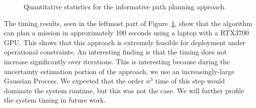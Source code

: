 \begin{figure}[H]
    \hfill
    \hfill
    \centering
    \caption{Quantitative statistics for the informative path planning approach.}
    \label{fig:results:ipp_quant}
\end{figure}

The timing results, seen in the leftmost part of Figure~\ref{fig:results:ipp_quant}, show that the algorithm can plan a mission in approximately 100 seconds using a laptop with a RTX3700 GPU. This shows that this approach is extremely feasible for deployment under operational constraints. An interesting finding is that the timing does not increase significantly over iterations. This is interesting because during the uncertainty estimation portion of the approach, we use an increasingly-large Gaussian Process. We expected that the order $n^3$ time of this step would dominate the system runtime, but this was not the case. We will further profile the system timing in future work.


